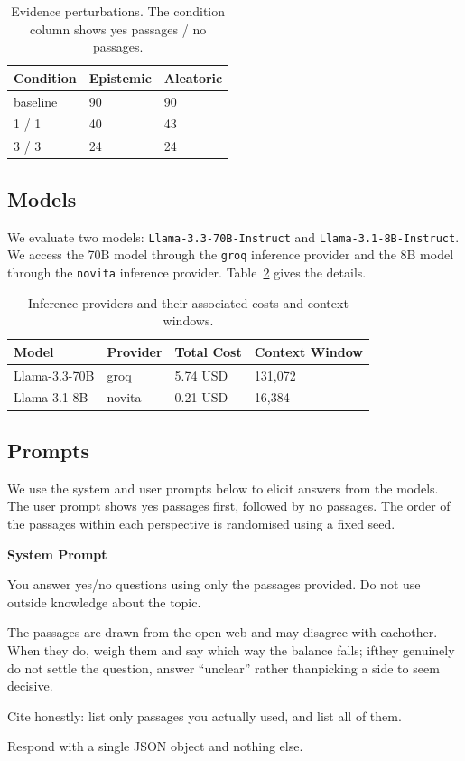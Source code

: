 \begin{table}[h!]
\begin{tabularx}{\columnwidth}{XXX}
\toprule
\textbf{Condition} & \textbf{Epistemic} & \textbf{Aleatoric} \\
\midrule
baseline & 90  & 90 \\
1 / 1 & 40 & 43 \\
3 / 3 & 24 & 24 \\
\bottomrule
\end{tabularx}
\caption{Evidence perturbations. The condition column shows yes passages / no passages.}
\label{tab:perturbations}
\end{table}

\subsection{Models}
\label{appendix_sub:models}
We evaluate two models: \texttt{Llama-3.3-70B-Instruct} and \texttt{Llama-3.1-8B-Instruct}. We access the 70B model through the \texttt{groq} inference provider and the 8B model through the \texttt{novita} inference provider. Table~\ref{tab:inference_providers} gives the details.


\begin{table}[ht!]
\centering
\small
\begin{tabularx}{\columnwidth}{XXXX}
\toprule
\textbf{Model} & \textbf{Provider} & \textbf{Total Cost} & \textbf{Context Window} \\
\midrule
Llama-3.3-70B & groq & 5.74 USD & 131,072 \\
Llama-3.1-8B & novita & 0.21 USD & 16,384 \\
\bottomrule
\end{tabularx}
\caption{Inference providers and their associated costs and context windows.}
\label{tab:inference_providers}
\end{table}

\subsection{Prompts}
\label{appendix_sub:prompts}

We use the system and user prompts below to elicit answers from the models. The user prompt shows yes passages first, followed by no passages. The order of the passages within each perspective is randomised using a fixed seed.

\begin{framed}
\textbf{System Prompt}

You answer yes/no questions using only the passages provided. Do not use outside knowledge about the topic.

The passages are drawn from the open web and may disagree with eachother. When they do, weigh them and say which way the balance falls; ifthey genuinely do not settle the question, answer ``unclear'' rather thanpicking a side to seem decisive.

Cite honestly: list only passages you actually used, and list all of them.

Respond with a single JSON object and nothing else.
\end{framed}

